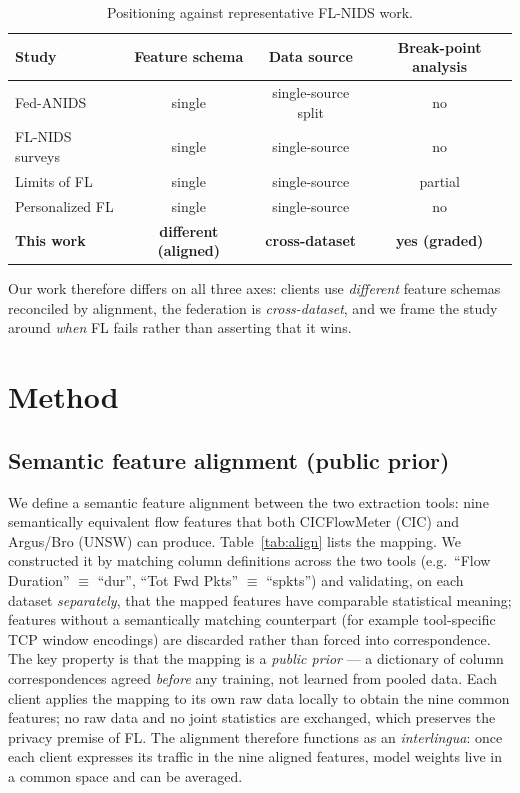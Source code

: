 \documentclass[11pt,a4paper]{article}
\begin{document}
\begin{table}[htbp]
\centering\small
\caption{Positioning against representative FL-NIDS work.}
\label{tab:position}
\begin{tabular}{@{}lccc@{}}
\toprule
Study & Feature schema & Data source & Break-point analysis \\
\midrule
Fed-ANIDS \cite{fedanids}        & single & single-source split & no \\
FL-NIDS surveys \cite{ref-fl-survey,ref-fl-review} & single & single-source & no \\
Limits of FL \cite{ref-limits}   & single & single-source & partial \\
Personalized FL \cite{ref-personalized} & single & single-source & no \\
\textbf{This work}               & \textbf{different (aligned)} & \textbf{cross-dataset} & \textbf{yes (graded)} \\
\bottomrule
\end{tabular}
\end{table}

Our work therefore differs on all three axes: clients use \emph{different}
feature schemas reconciled by alignment, the federation is \emph{cross-dataset}, and we
frame the study around \emph{when} FL fails rather than asserting that it wins.

\section{Method}
\subsection{Semantic feature alignment (public prior)}
We define a semantic feature alignment between the two extraction tools: nine
semantically equivalent flow features that both CICFlowMeter (CIC) and Argus/Bro
(UNSW) can produce. Table~\ref{tab:align} lists the mapping. We constructed it by
matching column definitions across the two tools (e.g.\ ``Flow Duration'' $\equiv$
``dur'', ``Tot Fwd Pkts'' $\equiv$ ``spkts'') and validating, on each dataset
\emph{separately}, that the mapped features have comparable statistical meaning;
features without a semantically matching counterpart (for example tool-specific
TCP window encodings) are discarded rather than forced into correspondence. The
key property is that the mapping is a \emph{public prior} --- a dictionary of
column correspondences agreed \emph{before} any training, not learned from pooled
data. Each client applies the mapping to its own raw data locally to obtain the
nine common features; no raw data and no joint statistics are exchanged, which
preserves the privacy premise of FL. The alignment therefore functions as an
\emph{interlingua}: once each client expresses its traffic in the nine aligned
features, model weights live in a common space and can be averaged.
\end{document}

